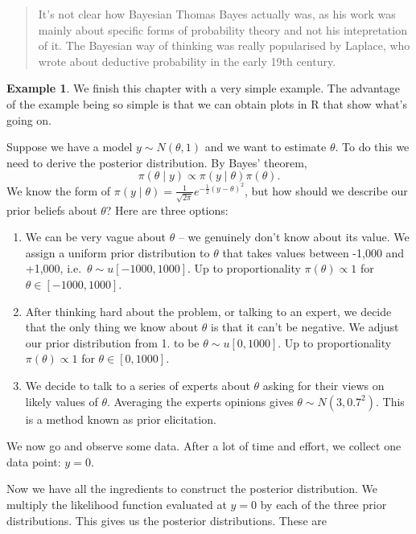 \documentclass[
]{book}
\theoremstyle{definition}
\theoremstyle{definition}
\newtheorem{example}{Example}[chapter]
\theoremstyle{definition}
\theoremstyle{definition}
\theoremstyle{remark}
\begin{document}
\begin{quote}
It's not clear how Bayesian Thomas Bayes actually was, as his work was mainly about specific forms of probability theory and not his intepretation of it. The Bayesian way of thinking was really popularised by Laplace, who wrote about deductive probability in the early 19th century.
\end{quote}

\begin{example}

We finish this chapter with a very simple example. The advantage of the example being so simple is that we can obtain plots in R that show what's going on.

Suppose we have a model \(y \sim N(\theta, 1)\) and we want to estimate \(\theta\). To do this we need to derive the posterior distribution. By Bayes' theorem,
\[
\pi(\theta \mid y) \propto \pi(y \mid \theta) \pi(\theta).
\]
We know the form of \(\pi(y \mid \theta) = \frac{1}{\sqrt{2\pi}}e^{-\frac{1}{2}(y - \theta)^2}\), but how should we describe our prior beliefs about \(\theta\)? Here are three options:

\begin{enumerate}
\def\labelenumi{\arabic{enumi}.}
\item
  We can be very vague about \(\theta\) -- we genuinely don't know about its value. We assign a uniform prior distribution to \(\theta\) that takes values between -1,000 and +1,000, i.e.~\(\theta \sim u[-1000, 1000]\). Up to proportionality \(\pi(\theta) \propto 1\) for \(\theta \in [-1000, 1000]\).
\item
  After thinking hard about the problem, or talking to an expert, we decide that the only thing we know about \(\theta\) is that it can't be negative. We adjust our prior distribution from 1. to be \(\theta \sim u[0, 1000]\). Up to proportionality \(\pi(\theta) \propto 1\) for \(\theta \in [0, 1000]\).
\item
  We decide to talk to a series of experts about \(\theta\) asking for their views on likely values of \(\theta\). Averaging the experts opinions gives \(\theta \sim N(3, 0.7^2)\). This is a method known as prior elicitation.
\end{enumerate}

We now go and observe some data. After a lot of time and effort, we collect one data point: \(y = 0\).

Now we have all the ingredients to construct the posterior distribution. We multiply the likelihood function evaluated at \(y = 0\) by each of the three prior distributions. This gives us the posterior distributions. These are


\end{example}
\end{document}
